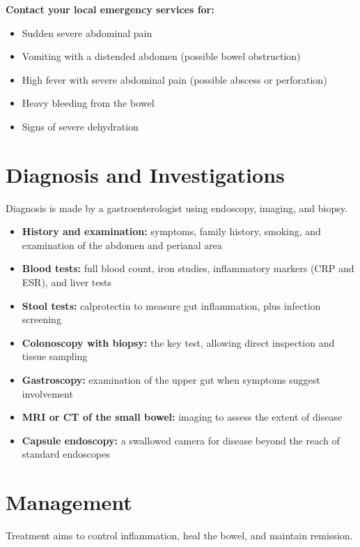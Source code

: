 \textbf{Contact your local emergency services for:}
\begin{itemize}
    \item Sudden severe abdominal pain
    \item Vomiting with a distended abdomen (possible bowel obstruction)
    \item High fever with severe abdominal pain (possible abscess or perforation)
    \item Heavy bleeding from the bowel
    \item Signs of severe dehydration
\end{itemize}

\section*{Diagnosis and Investigations}
Diagnosis is made by a gastroenterologist using endoscopy, imaging, and biopsy.

\begin{itemize}
    \item \textbf{History and examination:} symptoms, family history, smoking, and examination of the abdomen and perianal area
    \item \textbf{Blood tests:} full blood count, iron studies, inflammatory markers (CRP and ESR), and liver tests
    \item \textbf{Stool tests:} calprotectin to measure gut inflammation, plus infection screening
    \item \textbf{Colonoscopy with biopsy:} the key test, allowing direct inspection and tissue sampling
    \item \textbf{Gastroscopy:} examination of the upper gut when symptoms suggest involvement
    \item \textbf{MRI or CT of the small bowel:} imaging to assess the extent of disease
    \item \textbf{Capsule endoscopy:} a swallowed camera for disease beyond the reach of standard endoscopes
\end{itemize}

\section*{Management}
Treatment aims to control inflammation, heal the bowel, and maintain remission.

